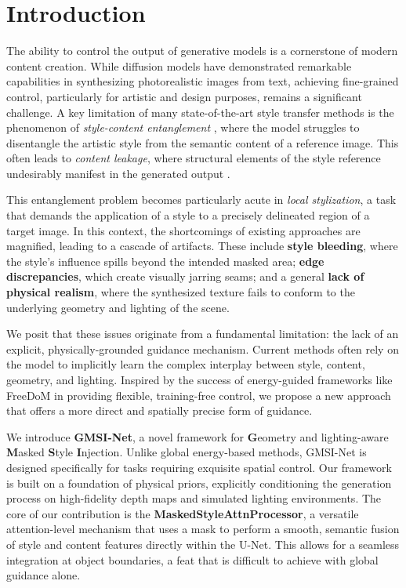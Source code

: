 \section{Introduction}

The ability to control the output of generative models is a cornerstone of modern content creation. While diffusion models have demonstrated remarkable capabilities in synthesizing photorealistic images from text, achieving fine-grained control, particularly for artistic and design purposes, remains a significant challenge. A key limitation of many state-of-the-art style transfer methods is the phenomenon of \textit{style-content entanglement} \cite{yang2024multiparty}, where the model struggles to disentangle the artistic style from the semantic content of a reference image. This often leads to \textit{content leakage}, where structural elements of the style reference undesirably manifest in the generated output \cite{wang2024instantstyle, xing2024csgo}.

This entanglement problem becomes particularly acute in \textit{local stylization}, a task that demands the application of a style to a precisely delineated region of a target image. In this context, the shortcomings of existing approaches are magnified, leading to a cascade of artifacts. These include \textbf{style bleeding}, where the style's influence spills beyond the intended masked area; \textbf{edge discrepancies}, which create visually jarring seams; and a general \textbf{lack of physical realism}, where the synthesized texture fails to conform to the underlying geometry and lighting of the scene.

We posit that these issues originate from a fundamental limitation: the lack of an explicit, physically-grounded guidance mechanism. Current methods often rely on the model to implicitly learn the complex interplay between style, content, geometry, and lighting. Inspired by the success of energy-guided frameworks like FreeDoM \cite{shi2023freedom} in providing flexible, training-free control, we propose a new approach that offers a more direct and spatially precise form of guidance.

We introduce \textbf{GMSI-Net}, a novel framework for \textbf{G}eometry and lighting-aware \textbf{M}asked \textbf{S}tyle \textbf{I}njection. Unlike global energy-based methods, GMSI-Net is designed specifically for tasks requiring exquisite spatial control. Our framework is built on a foundation of physical priors, explicitly conditioning the generation process on high-fidelity depth maps and simulated lighting environments. The core of our contribution is the \textbf{MaskedStyleAttnProcessor}, a versatile attention-level mechanism that uses a mask to perform a smooth, semantic fusion of style and content features directly within the U-Net. This allows for a seamless integration at object boundaries, a feat that is difficult to achieve with global guidance alone.

